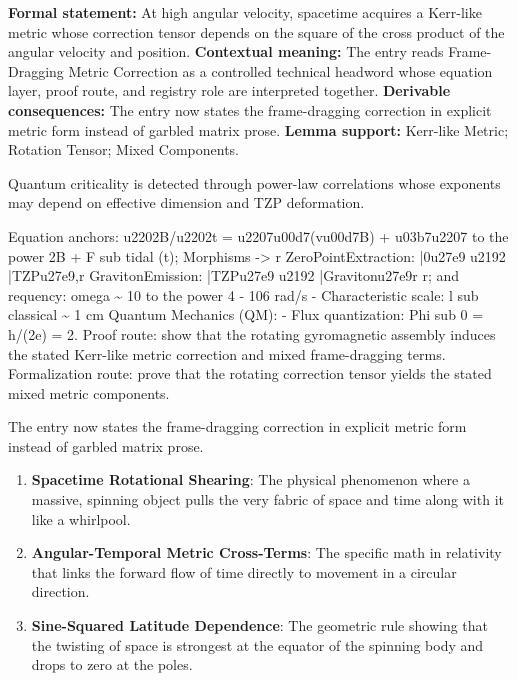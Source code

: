 \begingroup\footnotesize\setlength{\emergencystretch}{3em}\sloppy
\textbf{Formal statement:} At high angular velocity, spacetime acquires a Kerr-like metric whose correction tensor depends on the square of the cross product of the angular velocity and position. \textbf{Contextual meaning:} The entry reads Frame-Dragging Metric Correction as a controlled technical headword whose equation layer, proof route, and registry role are interpreted together. \textbf{Derivable consequences:} The entry now states the frame-dragging correction in explicit metric form instead of garbled matrix prose. \textbf{Lemma support:} Kerr-like Metric; Rotation Tensor; Mixed Components.\par
\endgroup

Quantum criticality is detected through power-law correlations whose exponents may depend on effective dimension and TZP deformation.

Equation anchors: u2202B/u2202t = u2207u00d7(vu00d7B) + u03b7u2207 to the power 2B + F sub tidal (t); Morphisms -> r ZeroPointExtraction: |0u27e9 u2192 |TZPu27e9,r GravitonEmission: |TZPu27e9 u2192 |Gravitonu27e9r r; and requency: omega \textasciitilde{} 10 to the power 4 - 106 rad/s - Characteristic scale: l sub classical \textasciitilde{} 1 cm Quantum Mechanics (QM): - Flux quantization: Phi sub 0 = h/(2e) = 2. Proof route: show that the rotating gyromagnetic assembly induces the stated Kerr-like metric correction and mixed frame-dragging terms. Formalization route: prove that the rotating correction tensor yields the stated mixed metric components.

The entry now states the frame-dragging correction in explicit metric form instead of garbled matrix prose.
\endgroup

\begin{enumerate}[leftmargin=1.6em,itemsep=6pt,topsep=4pt]
\item \textbf{Spacetime Rotational Shearing}: The physical phenomenon where a massive, spinning object pulls the very fabric of space and time along with it like a whirlpool.
\item \textbf{Angular-Temporal Metric Cross-Terms}: The specific math in relativity that links the forward flow of time directly to movement in a circular direction.
\item \textbf{Sine-Squared Latitude Dependence}: The geometric rule showing that the twisting of space is strongest at the equator of the spinning body and drops to zero at the poles.
\end{enumerate}


